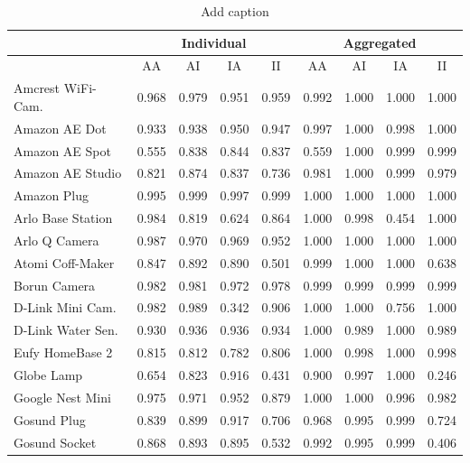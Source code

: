 \documentclass[journal]{IEEEtran}
\begin{document}
\begin{table}[htbp]
	\centering
	\setlength{\tabcolsep}{3pt}
	\caption{Add caption}
	\begin{tabular}{@{}lrrrrrrrr@{}}
		\cmidrule{2-9}          & \multicolumn{4}{c}{Individual}
		& \multicolumn{4}{c}{ Aggregated} \\
		\midrule
		& \multicolumn{1}{c}{AA} & \multicolumn{1}{c}{AI} & \multicolumn{1}{c}{IA} & \multicolumn{1}{c|}{II} & \multicolumn{1}{c}{AA} & \multicolumn{1}{c}{AI} & \multicolumn{1}{c}{IA} & \multicolumn{1}{c}{II} \\
		\midrule
		Amcrest WiFi-Cam. & 0.968 & 0.979 & 0.951 & 0.959 & 0.992 & 1.000 & 1.000 & 1.000 \\
		Amazon AE Dot & 0.933 & 0.938 & 0.950 & 0.947 & 0.997 & 1.000 & 0.998 & 1.000 \\
		Amazon AE Spot & 0.555 & 0.838 & 0.844 & 0.837 & 0.559 & 1.000 & 0.999 & 0.999 \\
		Amazon AE Studio & 0.821 & 0.874 & 0.837 & 0.736 & 0.981 & 1.000 & 0.999 & 0.979 \\
		Amazon Plug & 0.995 & 0.999 & 0.997 & 0.999 & 1.000 & 1.000 & 1.000 & 1.000 \\
		Arlo Base Station & 0.984 & 0.819 & 0.624 & 0.864 & 1.000 & 0.998 & 0.454 & 1.000 \\
		Arlo Q Camera & 0.987 & 0.970 & 0.969 & 0.952 & 1.000 & 1.000 & 1.000 & 1.000 \\
		Atomi Coff-Maker & 0.847 & 0.892 & 0.890 & 0.501 & 0.999 & 1.000 & 1.000 & 0.638 \\
		Borun Camera & 0.982 & 0.981 & 0.972 & 0.978 & 0.999 & 0.999 & 0.999 & 0.999 \\
		D-Link Mini Cam. & 0.982 & 0.989 & 0.342 & 0.906 & 1.000 & 1.000 & 0.756 & 1.000 \\
		D-Link Water Sen. & 0.930 & 0.936 & 0.936 & 0.934 & 1.000 & 0.989 & 1.000 & 0.989 \\
		Eufy HomeBase 2 & 0.815 & 0.812 & 0.782 & 0.806 & 1.000 & 0.998 & 1.000 & 0.998 \\
		Globe Lamp  & 0.654 & 0.823 & 0.916 & 0.431 & 0.900 & 0.997 & 1.000 & 0.246 \\
		Google Nest Mini & 0.975 & 0.971 & 0.952 & 0.879 & 1.000 & 1.000 & 0.996 & 0.982 \\
		Gosund Plug & 0.839 & 0.899 & 0.917 & 0.706 & 0.968 & 0.995 & 0.999 & 0.724 \\
		Gosund Socket & 0.868 & 0.893 & 0.895 & 0.532 & 0.992 & 0.995 & 0.999 & 0.406 \\

\end{tabular}
\end{table}
\end{document}
